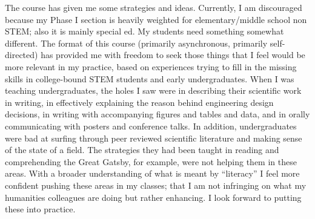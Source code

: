\documentclass{article}
\begin{document}
The course has given me some strategies and ideas. Currently, I am discouraged because my Phase I section is heavily weighted for elementary/middle school non STEM; also it is mainly special ed. My students need something somewhat different. The format of this course (primarily asynchronous, primarily self-directed) has provided me with freedom to seek those things that I feel would be more relevant in my practice, based on experiences trying to fill in the missing skills in college-bound STEM students and early undergraduates. When I was teaching undergraduates, the holes I saw were in describing their scientific work in writing, in effectively explaining the reason behind engineering design decisions, in writing with accompanying figures and tables and data, and in orally communicating with posters and conference talks. In addition, undergraduates were bad at surfing through peer reviewed scientific literature and making sense of the state of a field. The strategies they had been taught in reading and comprehending the Great Gatsby, for example, were not helping them in these areas. With a broader understanding of what is meant by ``literacy'' I feel more confident pushing these areas in my classes; that I am not infringing on what my humanities colleagues are doing but rather enhancing. I look forward to putting these into practice. 










\end{document}
